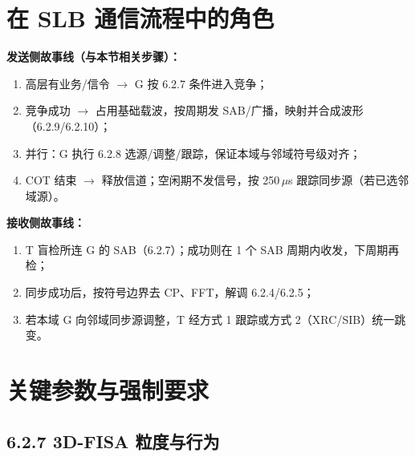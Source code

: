 \documentclass[11pt,a4paper]{ctexart}
\begin{document}
\section{在 SLB 通信流程中的角色}

\textbf{发送侧故事线（与本节相关步骤）：}
\begin{enumerate}[nosep]
  \item 高层有业务/信令 $\rightarrow$ G 按 6.2.7 条件进入竞争；
  \item 竞争成功 $\rightarrow$ 占用基础载波，按周期发 SAB/广播，映射并合成波形（6.2.9/6.2.10）；
  \item 并行：G 执行 6.2.8 选源/调整/跟踪，保证本域与邻域符号级对齐；
  \item COT 结束 $\rightarrow$ 释放信道；空闲期不发信号，按 250\,$\mu$s 跟踪同步源（若已选邻域源）。
\end{enumerate}

\textbf{接收侧故事线：}
\begin{enumerate}[nosep]
  \item T 盲检所连 G 的 SAB（6.2.7）；成功则在 1 个 SAB 周期内收发，下周期再检；
  \item 同步成功后，按符号边界去 CP、FFT，解调 6.2.4/6.2.5；
  \item 若本域 G 向邻域同步源调整，T 经方式 1 跟踪或方式 2（XRC/SIB）统一跳变。
\end{enumerate}

\section{关键参数与强制要求}

\subsection{6.2.7 3D-FISA 粒度与行为}
\end{document}
